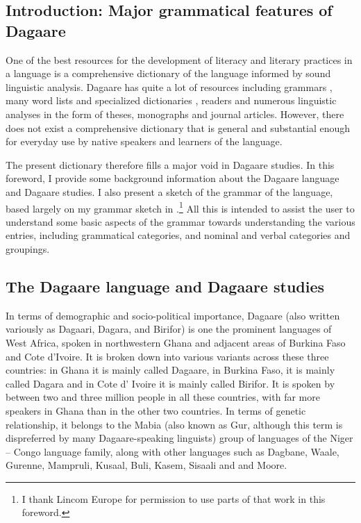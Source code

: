 \begin{refsection}


\chapter{Introduction: Major grammatical features of Dagaare}

One of the best resources for the development of literacy and literary practices in a language is a comprehensive dictionary of the language informed by sound linguistic analysis. Dagaare has quite a lot of resources including grammars \citep{Bodomo1997, Bodomo2000, Dakubu2005}, many word lists and specialized dictionaries \citep{Durand1953, Bodomo2004}, readers \citep{Zakpaa1978} and numerous linguistic analyses in the form of theses, monographs and journal articles. However, there does not exist a comprehensive dictionary that is general and substantial enough for everyday use by native speakers and learners of the language.

The present dictionary therefore fills a major void in Dagaare studies. In this foreword, I provide some background information about the Dagaare language and Dagaare studies. I also present a sketch of the grammar of the language, based largely on my grammar sketch in \citet{Bodomo2000}.\footnote{I thank Lincom Europe for permission to use parts of that work in this foreword.} All this is intended to assist the user to understand some basic aspects of the grammar towards understanding the various entries, including grammatical categories, and nominal and verbal categories and groupings. 

\section{The Dagaare language and Dagaare studies}\label{sec:dagaarestudies}
In terms of demographic and socio-political importance, Dagaare (also written variously as Dagaari, Dagara, and Birifor) is one the prominent languages of West Africa, spoken in northwestern Ghana and adjacent areas of Burkina Faso and Cote d’Ivoire. It is broken down into various variants across these three countries: in Ghana it is mainly called Dagaare, in Burkina Faso, it is mainly called Dagara and in Cote d’ Ivoire it is mainly called Birifor. It is spoken by between two and three million people in all these countries, with far more speakers in Ghana than in the other two countries.
In terms of genetic relationship, it belongs to the Mabia (also known as Gur, although this term is dispreferred by many Dagaare-speaking linguists) group of languages of the Niger – Congo language family, along with other languages such as Dagbane, Waale, Gurenne, Mampruli, Kusaal, Buli, Kasem, Sisaali and and Moore.


\end{refsection}
